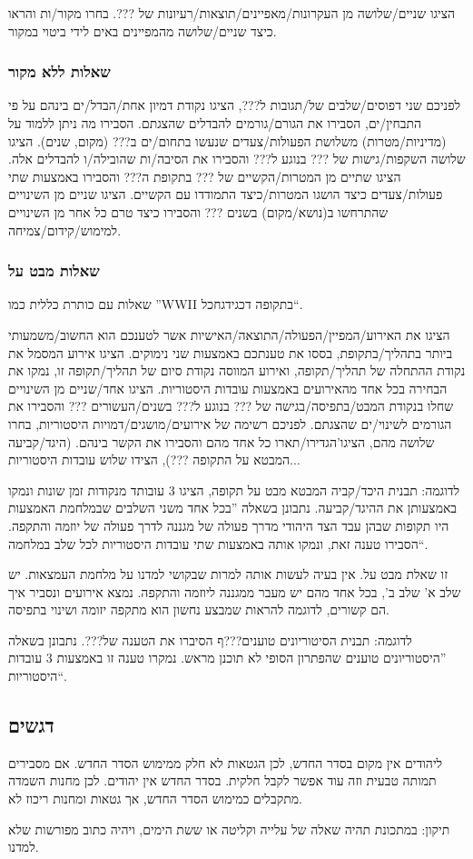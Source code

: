 \documentclass[]{../../../../tex/classes/styledArticle}
\begin{document}
	הציגו שניים/שלושה מן העקרונות/מאפיינים/תוצאות/רעיונות של ???. בחרו מקור/ות והראו כיצד שניים/שלושה מהמפיינים באים לידי ביטוי במקור. 
	
	\subsubsection*{שאלות ללא מקור}
	לפניכם שני דפוסים/שלבים של/תגובות ל???, הציגו נקודת דמיון אחת/הבדל/ים בינהם על פי התבחין/ים, הסבירו את הגורם/גורמים להבדלים שהצגתם. הסבירו מה ניתן ללמוד על (מדיניות/מטרות) משלושת הפעולות/צעדים שנעשו בתחום/ים ב??? (מקום, שנים). הציגו שלושה השקפות/גישות של ??? בנוגע ל??? והסבירו את הסיבה/ות שהובילה/ו להבדלים אלה. הציגו שתיים מן המטרות/הקשיים של ??? בתקופת ה??? והסבירו באמצעות שתי פעולות/צעדים כיצד הושגו המטרות/כיצד התמודדו עם הקשיים. הציגו שניים מן השינויים שהתרחשו ב(נושא/מקום) בשנים ??? והסבירו כיצד טרם כל אחר מן השינויים למימוש/קידום/צמיחה. 
	
	\subsubsection*{שאלות מבט על}
	שאלות עם כותרת כללית כמו ''WWII בתקופה דכגידגחכל``. 
	
	הציגו את האירוע/המפיין/הפעולה/התוצאה/האישיות אשר לטענכם הוא החשוב/משמעותי ביותר בתהליך/בתקופת, בססו את טענתכם באמצעות שני נימוקים. הציגו אירוע המסמל את נקודת ההתחלה של תהליך/תקופה, ואירוע המווסה נקודת סיום של תהליך/תקופה זו, נמקו את הבחירה בכל אחד מהאירועים באמצעות עובדות היסטוריות. הציגו אחד/שניים מן השינויים שחלו בנקודת המבט/בתפיסה/בגישה של ??? בנוגע ל??? בשנים/העשורים ??? והסבירו את הגורמים לשינוי/ים שהצגתם. לפניכם רשימה של אירועים/מושגים/דמויות היסטוריות, בחרו שלושה מהם, הציגו'הגדירו/תארו כל אחד מהם והסבירו את הקשר בינהם. (היגד/קביעה המבטא על התקופה ???), הצידו שלוש עובדות היסטוריות... 
	
	לדוגמה: תבנית היכד/קביה המבטא מבט על תקופה, הציגו 3 עובותד מנקודות זמן שונות ונמקו באמצעותן את ההיגד/קביעה. נתבונן בשאלה ''בכל אחד משני השלבים שבמלחמת האמצעות היו תקופות שבהן עבד הצד היהודי מדרך פעולה של מגננה לדרך פעולה של יוזמה והתקפה. הסבירו טענה זאת, ונמקו אותה באמצעות שתי עובדות היסטוריות לכל שלב במלחמה``. 
	
	זו שאלת מבט על. אין בעיה לעשות אותה למרות שבקושי למדנו על מלחמת העמצאות. יש שלב א' שלב ב', בכל אחד מהם יש מעבר ממגננה ליוזמה והתקפה. נמצא אירועים ונסביר איך הם קשורים, לדוגמה להראות שמבצע נחשון הוא מתקפה יזומה ושינוי בתפיסה. 
	
	לדוגמה: תבנית הסיטוריונים טוענים???ף הסיברו את הטענה של???. נתבונן בשאלה ''היסטוריונים טוענים שהפתרון הסופי לא תוכנן מראש. נמקרו טענה זו באמצעות 3 עובדות היסטוריות``. 
	
	
	\subsection*{דגשים}
	ליהודים אין מקום בסדר החדש, לכן הגטאות לא חלק ממימוש הסדר החדש. אם מסבירים תמותה טבעית וזה עוד אפשר לקבל חלקית. בסדר החדש אין יהודים. לכן מחנות השמדה מתקבלים כמימוש הסדר החדש, אך גטאות ומחנות ריכוז לא. 
	
	תיקון: במתכונת תהיה שאלה של עלייה וקליטה או ששת הימים, ויהיה כתוב מפורשות שלא למדנו. 
	
	
\end{document}
